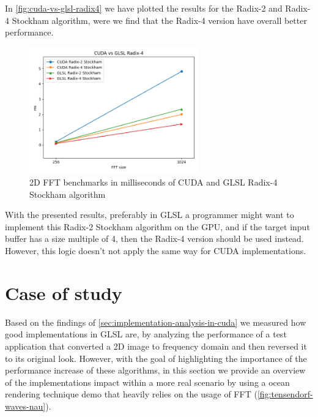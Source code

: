 \documentclass[
  oneside,
  11pt, a4paper,
  footinclude=true,
  headinclude=true,
  cleardoublepage=empty
]{scrbook}
\begin{document}
In \autoref{fig:cuda-vs-glsl-radix4} we have plotted the results for the Radix-2 and Radix-4 Stockham algorithm, were we find that the Radix-4 version have overall better performance.
\newline

\begin{figure}[H] 
    \centering
    \includegraphics[width=0.65\textwidth]{img/results/cuda_vs_glsl_radix4.png}
    \caption{2D FFT benchmarks in milliseconds of CUDA and GLSL Radix-4 Stockham algorithm}
    \label{fig:cuda-vs-glsl-radix4}
\end{figure}


With the presented results, preferably in GLSL a programmer might want to implement this Radix-2 Stockham algorithm on the GPU, and if the target input buffer has a size multiple of 4, then the Radix-4 version should be used instead. However, this logic doesn't not apply the same way for CUDA implementations.

\section{Case of study} \label{sec:case-of-study}

Based on the findings of \autoref{sec:implementation-analysis-in-cuda} we measured how good implementations in GLSL are, by analyzing the performance of a test application that converted a 2D image to frequency domain and then reversed it to its original look. However, with the goal of highlighting the importance of the performance increase of these algorithms, in this section we provide an overview of the implementations impact within a more real scenario by using a ocean rendering technique demo that heavily relies on the usage of FFT (\autoref{fig:tensendorf-waves-nau}).
\newline
\end{document}
